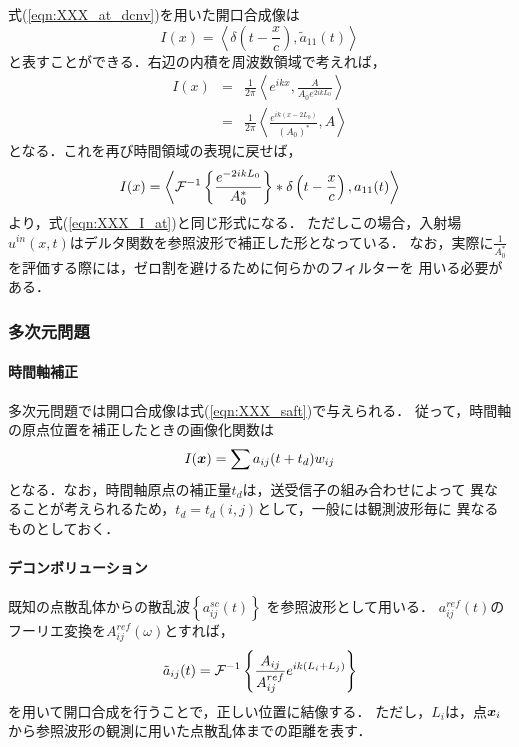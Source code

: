 式(\ref{eqn:XXX_at_dcnv})を用いた開口合成像は
\begin{equation}
	I(x)=\left< \delta\left(t-\frac{x}{c}\right), \tilde a_{11}(t) \right>
	\label{eqn:XXX_25}
\end{equation}
と表すことができる．右辺の内積を周波数領域で考えれば，
\begin{eqnarray}
	I(x) &=&
	\frac{1}{2\pi}\left< e^{ikx}, \frac{A}{A_0e^{2ikL_0}} \right> \\
	&=&
	\frac{1}{2\pi}\left< \frac{e^{ik(x-2L_0)}}{(A_0)^*}, A \right> 
	\label{eqn:XXX_26}
\end{eqnarray}
となる．これを再び時間領域の表現に戻せば，
\begin{equation}
	I(x)= 
	\left< 
	{\cal F}^{-1}\left\{ \frac{e^{-2ikL_0}}{A_0^*}\right\} *\delta \left( t-\frac{x}{c}\right), 
	a_{11}(t) \right>
	\label{eqn:XXX_Ix_dcnv}
\end{equation}
より，式(\ref{eqn:XXX_I_at})と同じ形式になる．
ただしこの場合，入射場$u^{in}(x,t)$はデルタ関数を参照波形で補正した形となっている．
なお，実際に$\frac{1}{A_0^*}$を評価する際には，ゼロ割を避けるために何らかのフィルターを
用いる必要がある．
\subsubsection{多次元問題}
\paragraph{時間軸補正}
多次元問題では開口合成像は式(\ref{eqn:XXX_saft})で与えられる．
従って，時間軸の原点位置を補正したときの画像化関数は
\begin{equation}
	I(\mbox{\boldmath $x$})=\sum a_{ij}(t+t_d)w_{ij}
	\label{eqn:XXX_27}
\end{equation}
となる．なお，時間軸原点の補正量$t_d$は，送受信子の組み合わせによって
異なることが考えられるため，$t_d=t_d(i,j)$として，一般には観測波形毎に
異なるものとしておく．
\paragraph{デコンボリューション}
既知の点散乱体からの散乱波$\left\{ a_{ij}^{sc}(t)\right\}$
を参照波形として用いる．
$a_{ij}^{ref}(t)$のフーリエ変換を$A^{ref}_{ij}(\omega)$とすれば，
\begin{equation}
	\tilde a_{ij}(t) = {\cal F}^{-1} 
	\left\{
		\frac{A_{ij}}{A_{ij}^{ref}}e^{ik(L_i+L_j)}
	\right\}
	\label{eqn:XXX_28}
\end{equation}
を用いて開口合成を行うことで，正しい位置に結像する．
ただし，$L_i$は，点$\mbox{\boldmath $x$}_i$から参照波形の観測に用いた点散乱体までの距離を表す．
%
